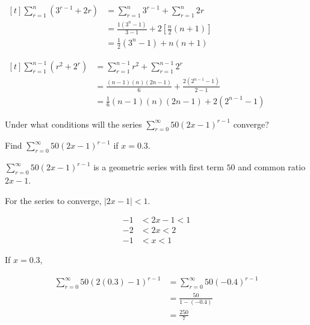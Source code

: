 \documentclass[11pt,a4paper]{book}
\begin{document}
\begin{example}
\begin{tasks}[label=(\alph*),label-width=3.5ex]
\task 
$
\begin{aligned}[t]
\sum_{r=1}^{n}\left(3^{r-1}+2r\right) & =\sum_{r=1}^{n}3^{r-1}+\sum_{r=1}^{n}2r\\
 & =\frac{1\left(3^{n}-1\right)}{3-1}+2\left[\frac{n}{2}\left(n+1\right)\right]\\
 & =\frac{1}{2}\left(3^{n}-1\right)+n\left(n+1\right)
\end{aligned}
$

\task 
$
\begin{aligned}[t]
\sum_{r=1}^{n-1}\left(r^{2}+2^{r}\right) & =\sum_{r=1}^{n-1}r^{2}+\sum_{r=1}^{n-1}2^{r}\\
 & =\frac{\left(n-1\right)\left(n\right)\left(2n-1\right)}{6}+\frac{2\left(2^{n-1}-1\right)}{2-1}\\
 & =\frac{1}{6}\left(n-1\right)\left(n\right)\left(2n-1\right)+2\left(2^{n-1}-1\right)
\end{aligned}
$

\end{tasks}

\end{example}

\newpage

\begin{example}

Under what conditions will the series ${\displaystyle \sum_{r=0}^{\infty}50\left(2x-1\right)^{r-1}}$ converge? 

Find ${\displaystyle \sum_{r=0}^{\infty}50\left(2x-1\right)^{r-1}}$
if $x=0.3$.

\Solution

${\displaystyle \sum_{r=0}^{\infty}50\left(2x-1\right)^{r-1}}$ is
a geometric series with first term $50$ and common ratio $2x-1$.

For the series to converge, $\left|2x-1\right|<1$. 

\begin{align*}
-1 & <2x-1<1\\
-2 & <2x<2\\
-1 & <x<1
\end{align*}

If $x=0.3$, 

\begin{align*}
{\displaystyle \sum_{r=0}^{\infty}50\left(2\left(0.3\right)-1\right)^{r-1}} & =\sum_{r=0}^{\infty}50\left(-0.4\right)^{r-1}\\
 & =\frac{50}{1-\left(-0.4\right)}\\
 & =\frac{250}{7}
\end{align*}

\end{example}
\end{document}
